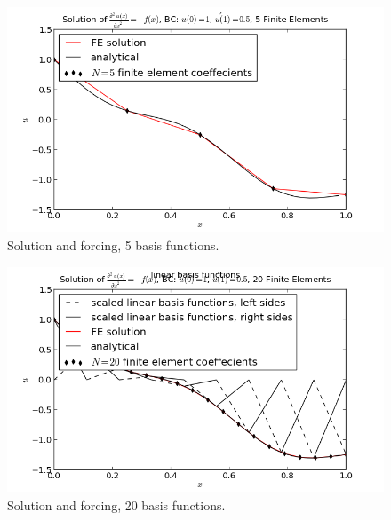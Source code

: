 \documentclass[10pt]{article}
\begin{document}
\begin{figure}[ht]
 \centering
 \includegraphics[width=\columnwidth,keepaspectratio=true]{./hw7-solution_and_forcing-N5.png}
 \caption{Solution and forcing, 5 basis functions.}
 \label{fig:sf5}
\end{figure}


\begin{figure}[ht]
 \centering
 \includegraphics[width=\columnwidth,keepaspectratio=true]{./hw7-solution_and_forcing-N20.png}
 \caption{Solution and forcing, 20 basis functions.}
 \label{fig:sf20}
\end{figure}
\end{document}

